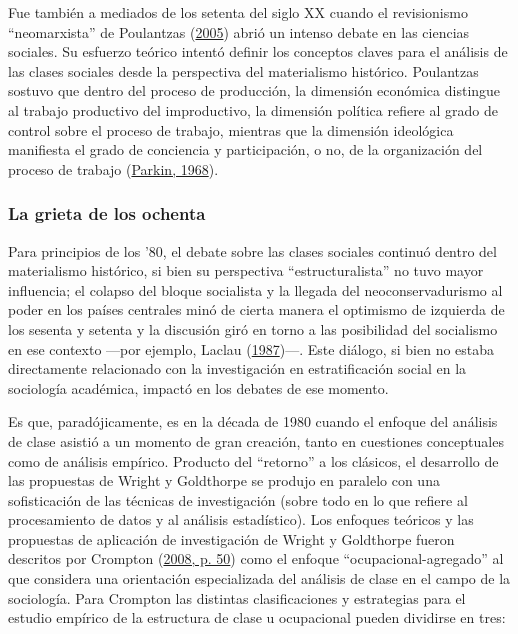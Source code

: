 \documentclass[
]{article}
\begin{document}
Fue también a mediados de los setenta del siglo XX cuando el revisionismo ``neomarxista'' de Poulantzas (\protect\hyperlink{ref-Poulantzas2005}{2005}) abrió un intenso debate en las ciencias sociales. Su esfuerzo teórico intentó definir los conceptos claves para el análisis de las clases sociales desde la perspectiva del materialismo histórico. Poulantzas sostuvo que dentro del proceso de producción, la dimensión económica distingue al trabajo productivo del improductivo, la dimensión política refiere al grado de control sobre el proceso de trabajo, mientras que la dimensión ideológica manifiesta el grado de conciencia y participación, o no, de la organización del proceso de trabajo (\protect\hyperlink{ref-Parkin1968}{Parkin, 1968}).

\hypertarget{la-grieta-de-los-ochenta}{%
\subsubsection{La grieta de los ochenta}\label{la-grieta-de-los-ochenta}}

Para principios de los '80, el debate sobre las clases sociales continuó dentro del materialismo histórico, si bien su perspectiva ``estructuralista'' no tuvo mayor influencia; el colapso del bloque socialista y la llegada del neoconservadurismo al poder en los países centrales minó de cierta manera el optimismo de izquierda de los sesenta y setenta y la discusión giró en torno a las posibilidad del socialismo en ese contexto ---por ejemplo, Laclau (\protect\hyperlink{ref-Laclau1987}{1987})---. Este diálogo, si bien no estaba directamente relacionado con la investigación en estratificación social en la sociología académica, impactó en los debates de ese momento.

Es que, paradójicamente, es en la década de 1980 cuando el enfoque del análisis de clase asistió a un momento de gran creación, tanto en cuestiones conceptuales como de análisis empírico. Producto del ``retorno'' a los clásicos, el desarrollo de las propuestas de Wright y Goldthorpe se produjo en paralelo con una sofisticación de las técnicas de investigación (sobre todo en lo que refiere al procesamiento de datos y al análisis estadístico). Los enfoques teóricos y las propuestas de aplicación de investigación de Wright y Goldthorpe fueron descritos por Crompton (\protect\hyperlink{ref-Crompton2008}{2008, p. 50}) como el enfoque ``ocupacional-agregado'' al que considera una orientación especializada del análisis de clase en el campo de la sociología. Para Crompton las distintas clasificaciones y estrategias para el estudio empírico de la estructura de clase u ocupacional pueden dividirse en tres:
\end{document}
